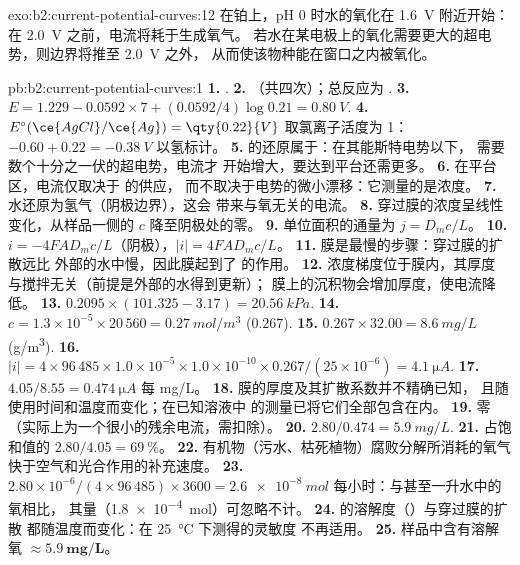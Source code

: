 \begin{solution}{exo:b2:current-potential-curves:12}
在铂上，pH 0 时水的氧化在 \qty{1.6}{V} 附近开始：
在 \qty{2.0}{V} 之前，电流将耗于生成氧气。
若水在某电极上的氧化需要更大的超电势，则边界将推至 \qty{2.0}{V} 之外，
从而使该物种能在窗口之内被氧化。
\end{solution}

\begin{solution}{pb:b2:current-potential-curves:1}
\textbf{1.} .
\textbf{2.} （共四次）；总反应为 .
\textbf{3.} $E = 1.229 - 0.0592 \times 7 + (0.0592/4)\log 0.21 = \qty{0.80}{V}$.
\textbf{4.} $E^\circ(\ce{AgCl}/\ce{Ag}) = \qty{0.22}{V}$ 取氯离子活度为 1：
$-0.60 + 0.22 = \qty{-0.38}{V}$ 以氢标计。
\textbf{5.}  的还原属于：在其能斯特电势以下，
需要数个十分之一伏的超电势，电流才
开始增大，要达到平台还需更多。
\textbf{6.} 在平台区，电流仅取决于  的供应，
而不取决于电势的微小漂移：它测量的是浓度。
\textbf{7.} 水还原为氢气（阴极边界），这会
带来与氧无关的电流。
\textbf{8.} 穿过膜的浓度呈线性变化，从样品一侧的 $c$
降至阴极处的零。
\textbf{9.} 单位面积的通量为 $j = D_m c/L$。
\textbf{10.} $i = -4FAD_m c/L$（阴极），$|i| = 4FAD_mc/L$。
\textbf{11.} 膜是最慢的步骤：穿过膜的扩散远比
外部的水中慢，因此膜起到了
的作用。
\textbf{12.} 浓度梯度位于膜内，其厚度
与搅拌无关（前提是外部的水得到更新）；
膜上的沉积物会增加厚度，使电流降低。
\textbf{13.} $0.2095 \times (101.325 - 3.17) = \qty{20.56}{kPa}$.
\textbf{14.} $c = 1.3 \times 10^{-5} \times 20\,560 = \qty{0.27}{mol/m^3}$ ($0.267$).
\textbf{15.} $0.267 \times 32.00 = \qty{8.6}{mg/L}$ (\unit{g/m^3}).
\textbf{16.} $|i| = 4 \times 96\,485 \times 1.0 \times 10^{-5} \times 1.0 \times 10^{-10}
\times 0.267/(25 \times 10^{-6}) = \qty{4.1}{\micro A}$.
\textbf{17.} $4.05/8.55 = \qty{0.474}{\micro A}$ 每 \unit{mg/L}。
\textbf{18.} 膜的厚度及其扩散系数并不精确已知，
且随使用时间和温度而变化；在已知溶液中
的测量已将它们全部包含在内。
\textbf{19.} 零（实际上为一个很小的残余电流，需扣除）。
\textbf{20.} $2.80/0.474 = \qty{5.9}{mg/L}$.
\textbf{21.} 占饱和值的 $2.80/4.05 = 69~\%$。
\textbf{22.} 有机物（污水、枯死植物）腐败分解所消耗的氧气
快于空气和光合作用的补充速度。
\textbf{23.} $2.80 \times 10^{-6}/(4 \times 96\,485) \times 3600 = \qty{2.6e-8}{mol}$
每小时：与甚至一升水中的氧相比，
其量（\qty{1.8e-4}{mol}）可忽略不计。
\textbf{24.}  的溶解度（）与穿过膜的扩散
都随温度而变化：在 \qty{25}{\degreeCelsius} 下测得的灵敏度
不再适用。
\textbf{25.} 样品中含有溶解
氧 $\boldsymbol{\approx \qty{5.9}{mg/L}}$。
\end{solution}
